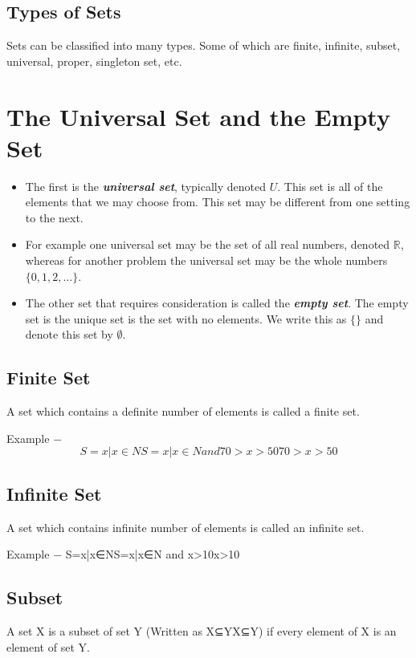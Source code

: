 
\subsection{Types of Sets}
Sets can be classified into many types. Some of which are finite, infinite, subset, universal, proper, singleton set, etc.

\section*{The Universal Set and the Empty Set}
\begin{itemize}
	\item The first is the \textbf{\textit{universal set}}, typically denoted $U$. This set is all of the elements that we may choose from. This set may be different from one setting to the next. 
	
	\item For example one universal set may be the set of all real numbers, denoted $\mathbb{R}$, whereas for another problem the universal set may be the whole numbers $\{0, 1, 2,\ldots\}$.
	
	\item The other set that requires consideration is called the \textit{\textbf{empty set}}. The empty set is the unique set is the set with no elements. We write this as $\{ \}$ and denote this set by $\emptyset$.
\end{itemize}

\subsection{Finite Set}
A set which contains a definite number of elements is called a finite set.

Example − \[S={x|x∈NS={x|x∈N and 70>x>50}70>x>50}\]
\subsection{Infinite Set}
A set which contains infinite number of elements is called an infinite set.

Example − S={x|x∈NS={x|x∈N and x>10}x>10}
\subsection{Subset}
A set X is a subset of set Y (Written as X⊆YX⊆Y) if every element of X is an element of set Y.

